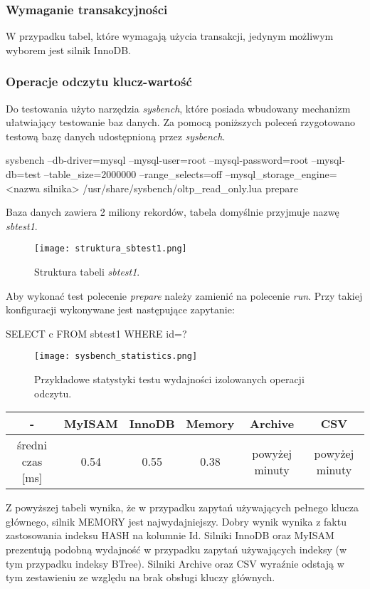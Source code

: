\subsubsection{Wymaganie transakcyjności}
W przypadku tabel, które wymagają użycia transakcji, jedynym możliwym wyborem jest silnik InnoDB.

\subsubsection{Operacje odczytu klucz-wartość}
Do testowania użyto narzędzia \textit{sysbench}, które posiada wbudowany mechanizm ułatwiający testowanie baz danych. Za pomocą poniższych poleceń rzygotowano testową bazę danych udostępnioną przez \textit{sysbench}. 
\begin{spverbatim}
	sysbench --db-driver=mysql --mysql-user=root --mysql-password=root --mysql-db=test --table_size=2000000 --range_selects=off --mysql_storage_engine=
	<nazwa silnika> /usr/share/sysbench/oltp_read_only.lua prepare
\end{spverbatim} 
Baza danych zawiera 2 miliony rekordów, tabela domyślnie przyjmuje nazwę \textit{sbtest1}.
\begin{figure}[H]
	\caption{Struktura tabeli \textit{sbtest1}.}
	\centering
	\texttt{[image: struktura\_sbtest1.png]}
	\label{fig:label}
\end{figure}

Aby wykonać test polecenie \textit{prepare} należy zamienić na polecenie \textit{run}. Przy takiej konfiguracji wykonywane jest następujące zapytanie:
\begin{spverbatim}
	SELECT c FROM sbtest1 WHERE id=?
\end{spverbatim}
\begin{figure}[H]
	\caption{Przykładowe statystyki testu wydajności izolowanych operacji odczytu.}
	\centering
	\texttt{[image: sysbench\_statistics.png]}
	\label{fig:label}
\end{figure}
\begin{center}
	\begin{tabular}{ | c | c | c | c | c | c |}
		\hline
		- & MyISAM & InnoDB & Memory & Archive & CSV  \\ 
		\hline
		średni czas [ms] & 0.54 & 0.55 & 0.38 & powyżej minuty & powyżej minuty \\
		\hline
	\end{tabular}
\end{center}
Z powyższej tabeli wynika, że w przypadku zapytań używających pełnego klucza głównego, silnik MEMORY jest najwydajniejszy. Dobry wynik wynika z faktu zastosowania indeksu HASH na kolumnie Id. Silniki InnoDB oraz MyISAM prezentują podobną wydajność w przypadku zapytań używających indeksy (w tym przypadku indeksy BTree). Silniki Archive oraz CSV wyraźnie odstają w tym zestawieniu ze względu na brak obsługi kluczy głównych.


